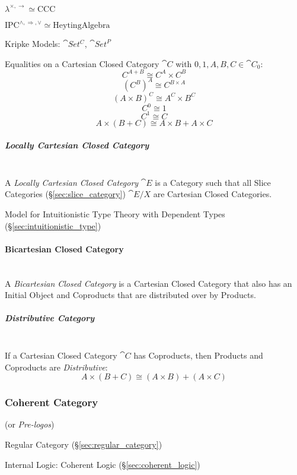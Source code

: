 $\lambda^{\times, \rightarrow} \simeq \mathrm{CCC}$

$\mathrm{IPC}^{\wedge, \Rightarrow, \vee} \simeq \mathrm{Heyting Algebra}$

Kripke Models: $\cat{Set^C}$, $\cat{Set}^P$ %

Equalities on a Cartesian Closed Category $\cat{C}$ with
$0,1,A,B,C \in \cat{C}_0$:
\[
  C^{A + B} \cong C^A \times C^B
\]\[
  (C^B)^A \cong C^{B \times A}
\]\[
  (A \times B)^C \cong A^C \times B^C
\]\[
  C^0 \cong 1
\]\[
  C^1 \cong C
\]\[
  A \times (B + C) \cong A \times B + A \times C
\]



\subparagraph{Locally Cartesian Closed Category}
\label{sec:locally_cartesian}
\hfill \\
A \emph{Locally Cartesian Closed Category} $\cat{E}$ is a Category
such that all Slice Categories (\S\ref{sec:slice_category})
$\cat{E}/X$ are Cartesian Closed Categories.

Model for Intuitionistic Type Theory with Dependent Types
(\S\ref{sec:intuitionistic_type})



\paragraph{Bicartesian Closed Category}\label{sec:bicartesian}
\hfill \\

A \emph{Bicartesian Closed Category} is a Cartesian Closed Category
that also has an Initial Object and Coproducts that are distributed
over by Products.



\subparagraph{Distributive Category}\label{sec:distributive_category}
\hfill \\

If a Cartesian Closed Category $\cat{C}$ has Coproducts, then
Products and Coproducts are \emph{Distributive}:\cite{awodey06}
\[
  A \times (B + C) \cong (A \times B) + (A \times C)
\]



\subsubsection{Coherent Category}\label{sec:coherent_category}

(or \emph{Pre-logos})

Regular Category (\S\ref{sec:regular_category})

Internal Logic: Coherent Logic (\S\ref{sec:coherent_logic})



